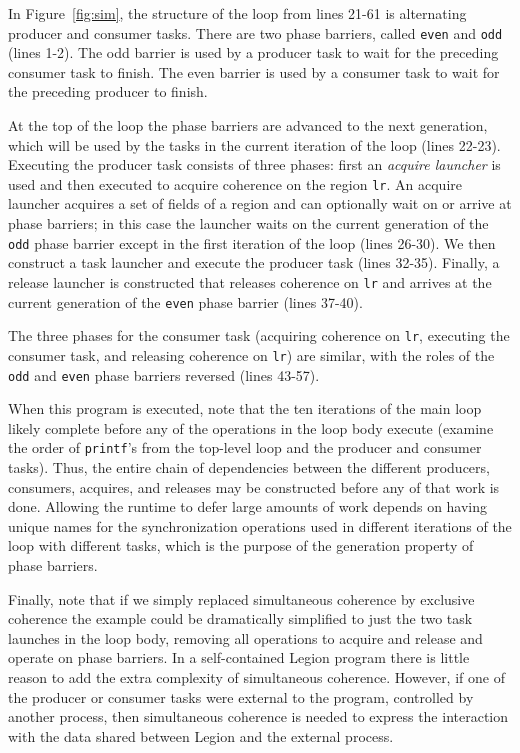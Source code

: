 In Figure~\ref{fig:sim}, the structure of the loop from lines 21-61 is alternating producer and consumer tasks.  There are two phase barriers, called {\tt even} and {\tt odd} (lines 1-2).  The odd barrier is used by a producer task to wait for the preceding consumer task to finish.  The even barrier is used by a consumer task to wait for the preceding producer
to finish.

At the top of the loop the phase barriers are advanced to the next generation, which will be used by the tasks in the current iteration of the loop (lines 22-23).  Executing the producer task consists of three phases:
first an {\em acquire launcher} is used and then executed to acquire coherence on the region {\tt lr}.  An acquire launcher acquires a set of fields of a region and can optionally wait on or arrive at phase barriers; in this case the launcher waits on the current generation of the {\tt odd}
phase barrier except in the first iteration of the loop (lines 26-30).  We then construct a task launcher and execute the producer task (lines 32-35).  Finally, a release launcher is constructed that releases coherence on {\tt lr} and arrives at the current generation of the
{\tt even} phase barrier (lines 37-40).

The three phases for the consumer task (acquiring coherence on {\tt lr}, executing the consumer task, and releasing coherence on {\tt lr}) are similar, with the roles of the {\tt odd} and {\tt even} phase barriers reversed (lines 43-57).

When this program is executed, note that the ten iterations of the main loop likely complete before any of the operations in the loop body execute (examine the order of {\tt printf}'s from the top-level loop and the producer and consumer tasks).  Thus, the entire chain of dependencies between the different producers, consumers, acquires, and releases may be constructed before any of that work is done.  Allowing the runtime to defer large amounts of work depends on having unique names for the synchronization operations used in different iterations of the loop
with different tasks, which is the purpose of the generation property of phase barriers.

Finally, note that if we simply replaced simultaneous coherence by exclusive coherence the example could be dramatically simplified to just the two task launches in the loop body, removing all operations to acquire and release and operate on phase barriers.  In a self-contained
Legion program there is little reason to add the extra complexity of simultaneous coherence.  However, if one of the producer or consumer tasks were external to the program, controlled by another process, then simultaneous coherence is needed to express the interaction with the
data shared between Legion and the external process.

